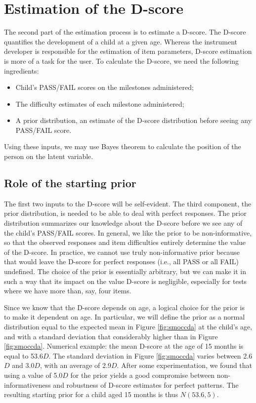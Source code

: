 \documentclass[
]{book}
\begin{document}
\hypertarget{sec:dscoreestimation}{%
\section{Estimation of the D-score}\label{sec:dscoreestimation}}

The second part of the estimation process is to estimate a D-score. The D-score quantifies the development of a child at a given age. Whereas the instrument developer is responsible for the estimation of item parameters, D-score estimation is more of a task for the user. To calculate the D-score, we need the following ingredients:

\begin{itemize}
\item
  Child's PASS/FAIL scores on the milestones administered;
\item
  The difficulty estimates of each milestone administered;
\item
  A prior distribution, an estimate of the D-score distribution before seeing any PASS/FAIL score.
\end{itemize}

Using these inputs, we may use Bayes theorem to calculate the position of the person on the latent variable.

\hypertarget{sec:startingprior}{%
\subsection{Role of the starting prior}\label{sec:startingprior}}

The first two inputs to the D-score will be self-evident. The third component, the prior distribution, is needed to be able to deal with perfect responses. The prior distribution summarizes our knowledge about the D-score before we see any of the child's PASS/FAIL scores. In general, we like the prior to be non-informative, so that the observed responses and item difficulties entirely determine the value of the D-score. In practice, we cannot use truly non-informative prior because that would leave the D-score for perfect responses (i.e., all PASS or all FAIL) undefined. The choice of the prior is essentially arbitrary, but we can make it in such a way that its impact on the value D-score is negligible, especially for tests where we have more than, say, four items.

Since we know that the D-score depends on age, a logical choice for the prior is to make it dependent on age. In particular, we will define the prior as a normal distribution equal to the expected mean in Figure \ref{fig:smoccda} at the child's age, and with a standard deviation that considerably higher than in Figure \ref{fig:smoccda}. Numerical example: the mean D-score at the age of 15 months is equal to 53.6\(D\). The standard deviation in Figure \ref{fig:smoccda} varies between 2.6\(D\) and 3.0\(D\), with an average of 2.9\(D\). After some experimentation, we found that using a value of 5.0\(D\) for the prior yields a good compromise between non-informativeness and robustness of D-score estimates for perfect patterns. The resulting starting prior for a child aged 15 months is thus \(N(53.6, 5)\).
\end{document}
